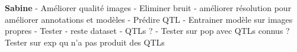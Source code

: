 \documentclass[english]{article}
\begin{document}
\textbf{Sabine}
- Améliorer qualité images
    - Eliminer bruit
    - améliorer résolution pour améliorer annotations et modèles
- Prédire QTL
- Entrainer modèle sur images propres
- Tester
    - reste dataset
    - QTLs ?
    - Tester sur pop avec QTLs connus ?
    Tester sur exp qu n'a pas produit des QTLs
\end{document}

